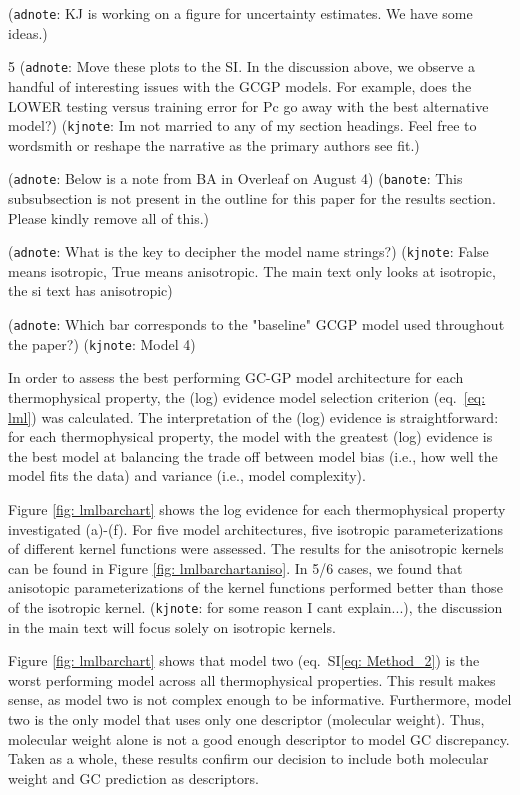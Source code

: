 \documentclass[journal=jacsat,manuscript=article, ]{achemso}
\newcommand{\kjnote}[1]{{\color{Blue} (\texttt{kjnote}: #1)}}
\newcommand{\adnote}[1]{{\color{OliveGreen} (\texttt{adnote}: #1)}}
\newcommand{\banote}[1]{{\color{Salmon} (\texttt{banote}: #1)}}
\newcommand{\siref}[1]{SI\eqref{#1}}
\begin{document}
\adnote{KJ is working on a figure for uncertainty estimates. We have some ideas.}


5%
\adnote{Move these plots to the SI. In the discussion above, we observe a handful of interesting issues with the GCGP models. For example, does the LOWER testing versus training error for Pc go away with the best alternative model?}
\kjnote{Im not married to any of my section headings. Feel free to wordsmith or reshape the narrative as the primary authors see fit.}

\adnote{Below is a note from BA in Overleaf on August 4}
\banote{This subsubsection is not present in the outline for this paper for the results section. Please kindly remove all of this.}

\adnote{What is the key to decipher the model name strings?} \kjnote{False means isotropic, True means anisotropic. The main text only looks at isotropic, the si text has anisotropic}

\adnote{Which bar corresponds to the "baseline" GCGP model used throughout the paper?} \kjnote{Model 4}


\newpage



In order to assess the best performing GC-GP model architecture for each thermophysical property, the (log) evidence model selection criterion (eq.~\eqref{eq: lml}) was calculated. The interpretation of the (log) evidence is straightforward: for each thermophysical property, the model with the greatest (log) evidence is the best model at balancing the trade off between model bias (i.e., how well the model fits the data) and variance (i.e., model complexity). 

Figure \ref{fig: lmlbarchart} shows the log evidence for each thermophysical property investigated (a)-(f). For five model architectures, five isotropic parameterizations of different kernel functions were assessed. The results for the anisotropic kernels can be found in Figure \ref{fig: lmlbarchartaniso}. In 5/6 cases, we found that anisotopic parameterizations of the kernel functions performed better than those of the isotropic kernel. \kjnote{for some reason I cant explain...}, the discussion in the main text will focus solely on isotropic kernels. 

Figure \ref{fig: lmlbarchart} shows that model two (eq.~\siref{eq: Method_2}) is the worst performing model across all thermophysical properties. This result makes sense, as model two is not complex enough to be informative. Furthermore, model two is the only model that uses only one descriptor (molecular weight). Thus, molecular weight alone is not a good enough descriptor to model GC discrepancy. Taken as a whole, these results confirm our decision to include both molecular weight and GC prediction as descriptors.
\end{document}
